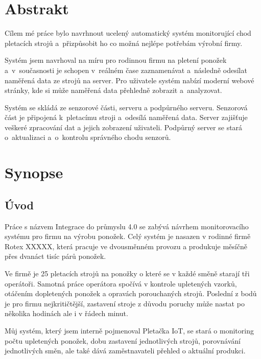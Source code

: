 \documentclass{template/socthesis}
\begin{document}


\chapter{Abstrakt}

Cílem mé práce bylo navrhnout ucelený automatický systém monitorující chod pletacích strojů a~přizpůsobit ho co možná nejlépe potřebám výrobní firmy.

Systém jsem navrhoval na míru pro rodinnou firmu na pletení ponožek a~v sou\-čas\-nos\-ti je schopen v~reálném čase zaznamenávat a~následně odesílat naměřená data ze strojů na server. 
Pro uživatele systém nabízí moderní webové stránky, kde si může naměřená data přehledně zobrazit a~analyzovat.

Systém se skládá ze senzorové části, serveru a podpůrného serveru.
Senzorová část je připojená k~pletacímu stroji a~odesílá naměřená data.
Server zajišťuje veškeré zpracování dat a jejich zobrazení uživateli.
Podpůrný server se stará o~aktualizaci a~o~kontrolu správného chodu senzorů.


\chapter{Synopse}



\section{Úvod}
Práce s názvem Integrace do průmyslu 4.0 se zabývá návrhem monitorovacího systému pro firmu na výrobu ponožek.
Celý systém je nasazen v rodinné firmě Rotex XXXXX, která pracuje ve dvousměnném provozu a produkuje měsíčně přes dvanáct tisíc párů ponožek.

Ve firmě je 25 pletacích strojů na ponožky o které se v každé směně starají tři operátoři.
Samotná práce operátora spočívá v kontrole upletených vzorků, otáčením dopletených ponožek a opravách porouchaných strojů.
Poslední z bodů je pro firmu nejkritičtější, zastavení stroje z důvodu poruchy může nastat po několika hodinách ale i v řádech minut.

Můj systém, který jsem interně pojmenoval Pletačka IoT, se stará o monitoring počtu upletených ponožek, dobu zastavení jednotlivých strojů, porovnávání jednotlivých směn, ale také dává zaměstnavateli přehled o aktuální produkci.
\end{document}
